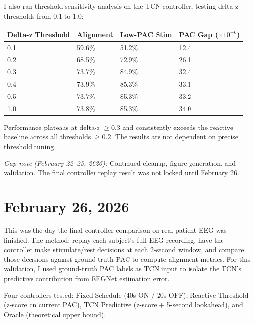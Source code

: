 \documentclass[11pt,letterpaper]{article}
\begin{document}
I also ran threshold sensitivity analysis on the TCN controller, testing delta-z thresholds
from 0.1 to 1.0:

\vspace{0.5em}
\begin{tabular}{@{}llll@{}}
\toprule
\textbf{Delta-z Threshold} & \textbf{Alignment} & \textbf{Low-PAC Stim} & \textbf{PAC Gap ($\times 10^{-6}$)} \\
\midrule
0.1 & 59.6\% & 51.2\% & 12.4 \\
0.2 & 68.5\% & 72.9\% & 26.1 \\
0.3 & 73.7\% & 84.9\% & 32.4 \\
0.4 & 73.9\% & 85.3\% & 33.1 \\
0.5 & 73.7\% & 85.3\% & 33.2 \\
1.0 & 73.8\% & 85.3\% & 34.0 \\
\bottomrule
\end{tabular}
\vspace{0.5em}

Performance plateaus at delta-z $\geq 0.3$ and consistently exceeds the reactive baseline
across all thresholds $\geq 0.2$. The results are not dependent on precise threshold tuning.

\textit{Gap note (February 22--25, 2026):} Continued cleanup, figure generation, and
validation. The final controller replay result was not locked until February 26.

\section*{February 26, 2026}

This was the day the final controller comparison on real patient EEG was finished. The method:
replay each subject's full EEG recording, have the controller make stimulate/rest decisions at
each 2-second window, and compare those decisions against ground-truth PAC to compute alignment
metrics. For this validation, I used ground-truth PAC labels as TCN input to isolate the TCN's
predictive contribution from EEGNet estimation error.

Four controllers tested: Fixed Schedule (40s ON / 20s OFF), Reactive Threshold (z-score on
current PAC), TCN Predictive (z-score + 5-second lookahead), and Oracle (theoretical upper
bound).
\end{document}

